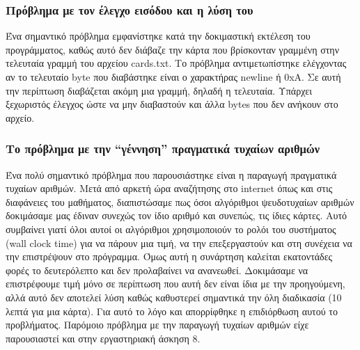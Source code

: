 \documentclass[10pt,a4paper]{article}
\begin{document}
\subsubsection*{Πρόβλημα με τον έλεγχο εισόδου και η λύση του}

	Ένα σημαντικό πρόβλημα εμφανίστηκε κατά την δοκιμαστική εκτέλεση του προγράμματος, καθώς αυτό δεν διάβαζε την κάρτα που βρίσκονταν γραμμένη στην τελευταία γραμμή του αρχείου \latintext cards.txt\greektext. Το πρόβλημα αντιμετωπίστηκε ελέγχοντας αν το τελευταίο byte που διαβάστηκε είναι ο χαρακτήρας newline ή \latintext 0xA\greektext. Σε αυτή την περίπτωση διαβάζεται ακόμη μια γραμμή, δηλαδή η τελευταία. Υπάρχει ξεχωριστός έλεγχος ώστε να μην διαβαστούν και άλλα \latintext bytes \greektext που δεν ανήκουν στο αρχείο.

\subsubsection*{Το πρόβλημα με την “γέννηση” πραγματικά τυχαίων αριθμών}

	Ένα πολύ σημαντικό πρόβλημα που παρουσιάστηκε είναι η παραγωγή πραγματικά τυχαίων αριθμών. Μετά από αρκετή ώρα αναζήτησης στο \latintext internet \greektext όπως και στις διαφάνειες του μαθήματος, διαπιστώσαμε πως όσοι αλγόριθμοι ψευδοτυχαίων αριθμών δοκιμάσαμε μας έδιναν συνεχώς τον ίδιο αριθμό και συνεπώς, τις ίδιες κάρτες. Αυτό συμβαίνει γιατί όλοι αυτοί οι αλγόριθμοι χρησιμοποιούν το ρολόι του συστήματος \latintext (wall clock time) \greektext για να πάρουν μια τιμή, να την επεξεργαστούν και στη συνέχεια να την επιστρέψουν στο πρόγραμμα. Όμως αυτή η συνάρτηση καλείται εκατοντάδες φορές το δευτερόλεπτο και δεν προλαβαίνει να ανανεωθεί. Δοκιμάσαμε να επιστρέφουμε τιμή μόνο σε περίπτωση που αυτή δεν είναι ίδια με την προηγούμενη, αλλά αυτό δεν αποτελεί λύση καθώς καθυστερεί σημαντικά την όλη διαδικασία (10 λεπτά για μια κάρτα). Για αυτό το λόγο και απορρίφθηκε η επιδιόρθωση αυτού το προβλήματος. Παρόμοιο πρόβλημα με την παραγωγή τυχαίων αριθμών είχε παρουσιαστεί και στην εργαστηριακή άσκηση 8.
\end{document}
